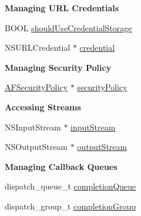 \begin{Indent}{\bf Managing U\+R\+L Credentials}\par
{\em 

 

 }\begin{DoxyCompactItemize}
\item 
B\+O\+O\+L \hyperlink{interface_a_f_u_r_l_connection_operation_a48bd01b0c9afd1f5234d01d28e3764e7}{should\+Use\+Credential\+Storage}
\item 
N\+S\+U\+R\+L\+Credential $\ast$ \hyperlink{interface_a_f_u_r_l_connection_operation_a3117677d8c96460f0bd1b4d3b13b6da8}{credential}
\end{DoxyCompactItemize}
\end{Indent}
\begin{Indent}{\bf Managing Security Policy}\par
{\em 

 

 }\begin{DoxyCompactItemize}
\item 
\hyperlink{interface_a_f_security_policy}{A\+F\+Security\+Policy} $\ast$ \hyperlink{interface_a_f_u_r_l_connection_operation_a7535b654217ef37bc653da145eb537df}{security\+Policy}
\end{DoxyCompactItemize}
\end{Indent}
\begin{Indent}{\bf Accessing Streams}\par
{\em 

 

 }\begin{DoxyCompactItemize}
\item 
N\+S\+Input\+Stream $\ast$ \hyperlink{interface_a_f_u_r_l_connection_operation_a2a8f5ad38fa0f464f0104f9e46cf4043}{input\+Stream}
\item 
N\+S\+Output\+Stream $\ast$ \hyperlink{interface_a_f_u_r_l_connection_operation_a6778c4ebc8739292f8aa0ebdffba0749}{output\+Stream}
\end{DoxyCompactItemize}
\end{Indent}
\begin{Indent}{\bf Managing Callback Queues}\par
{\em 

 

 }\begin{DoxyCompactItemize}
\item 
dispatch\+\_\+queue\+\_\+t \hyperlink{interface_a_f_u_r_l_connection_operation_a18619e16ca125bb52c17c3ec80acccfb}{completion\+Queue}
\item 
dispatch\+\_\+group\+\_\+t \hyperlink{interface_a_f_u_r_l_connection_operation_aa4955286ccd61583815487d48e87dbdc}{completion\+Group}
\end{DoxyCompactItemize}
\end{Indent}
